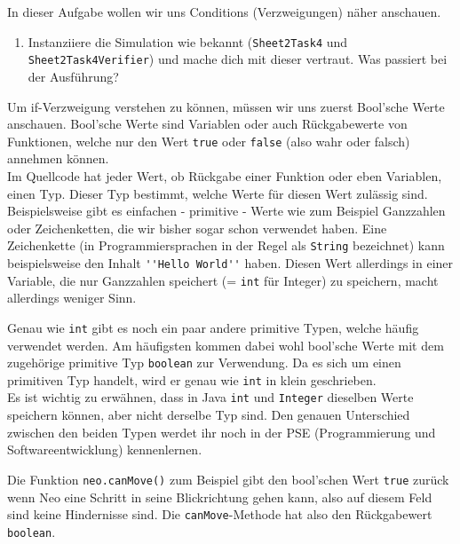 

In dieser Aufgabe wollen wir uns Conditions (Verzweigungen) näher anschauen.

\begin{enumerate}                           
    \item Instanziiere die Simulation wie bekannt (\lstinline{Sheet2Task4} und \lstinline{Sheet2Task4Verifier}) und mache dich mit dieser vertraut.
        Was passiert bei der Ausführung?
\end{enumerate}

\begin{Infobox}
    Um if-Verzweigung verstehen zu können, müssen wir uns zuerst Bool'sche Werte anschauen. Bool'sche Werte sind Variablen oder auch Rückgabewerte von Funktionen, welche nur den Wert \lstinline{true} oder \lstinline{false} (also wahr oder falsch) annehmen können. \\
    Im Quellcode hat jeder Wert, ob Rückgabe einer Funktion oder eben Variablen, einen Typ.
    Dieser Typ bestimmt, welche Werte für diesen Wert zulässig sind.
    Beispielsweise gibt es einfachen - primitive - Werte wie zum Beispiel Ganzzahlen oder Zeichenketten, die wir bisher sogar schon verwendet haben.
    Eine Zeichenkette (in Programmiersprachen in der Regel als \lstinline{String} bezeichnet) kann beispielsweise den Inhalt \lstinline{''Hello World''} haben.
    Diesen Wert allerdings in einer Variable, die nur Ganzzahlen speichert (= \lstinline{int} für Integer) zu speichern, macht allerdings weniger Sinn.
    
    Genau wie \lstinline{int} gibt es noch ein paar andere primitive Typen, welche häufig verwendet werden.
    Am häufigsten kommen dabei wohl bool'sche Werte mit dem zugehörige primitive Typ \lstinline{boolean} zur Verwendung.
    Da es sich um einen primitiven Typ handelt, wird er genau wie \lstinline{int} in klein geschrieben.\\
    
    Es ist wichtig zu erwähnen, dass in Java \lstinline{int} und \lstinline{Integer} dieselben Werte speichern können, aber nicht derselbe Typ sind.
    Den genauen Unterschied zwischen den beiden Typen werdet ihr noch in der PSE (Programmierung und Softwareentwicklung) kennenlernen.
    
    Die Funktion \lstinline{neo.canMove()} zum Beispiel gibt den bool'schen Wert \lstinline{true} zurück wenn Neo eine Schritt in seine Blickrichtung gehen kann, also auf diesem Feld sind keine Hindernisse sind.
    Die \lstinline{canMove}-Methode hat also den Rückgabewert \lstinline{boolean}.
    
\end{Infobox}

